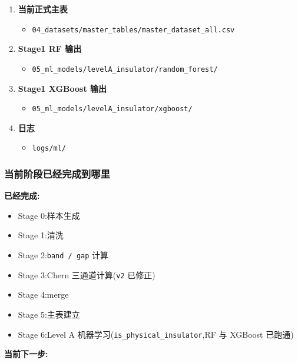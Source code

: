 \documentclass[lang=cn,scheme=chinese,color=blue,device=normal,toc=onecol,math=cm]{elegantbook}
\begin{document}
\begin{enumerate}
\begin{itemize}
\end{itemize}
\item \textbf{当前正式主表} 
\begin{itemize}
\item \texttt{04\_\allowbreak{}datasets/\allowbreak{}master\_\allowbreak{}tables/\allowbreak{}master\_\allowbreak{}dataset\_\allowbreak{}all.csv}
\end{itemize}
\item \textbf{Stage1 RF 输出} 
\begin{itemize}
\item \texttt{05\_\allowbreak{}ml\_\allowbreak{}models/\allowbreak{}levelA\_\allowbreak{}insulator/\allowbreak{}random\_\allowbreak{}forest/\allowbreak{}}
\end{itemize}
\item \textbf{Stage1 XGBoost 输出} 
\begin{itemize}
\item \texttt{05\_\allowbreak{}ml\_\allowbreak{}models/\allowbreak{}levelA\_\allowbreak{}insulator/\allowbreak{}xgboost/\allowbreak{}}
\end{itemize}
\item \textbf{日志} 
\begin{itemize}
\item \texttt{logs/\allowbreak{}ml/\allowbreak{}}
\end{itemize}
\end{enumerate}


\subsubsection{当前阶段已经完成到哪里}


\textbf{已经完成:}\par


\begin{itemize}
\item Stage 0:样本生成
\item Stage 1:清洗
\item Stage 2:\texttt{band /\allowbreak{} gap} 计算
\item Stage 3:Chern 三通道计算(\texttt{v2} 已修正)
\item Stage 4:merge
\item Stage 5:主表建立
\item Stage 6:Level A 机器学习(\texttt{is\_\allowbreak{}physical\_\allowbreak{}insulator},RF 与 XGBoost 已跑通)
\end{itemize}


\textbf{当前下一步:}\par
\end{document}
